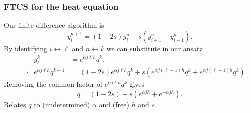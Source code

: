 \documentclass{beamer}
\begin{document}
\begin{frame}
  \frametitle{FTCS for the heat equation}

  Our finite difference algorithm is
  \begin{equation*}
    y_i^{n+1} = ( 1 - 2 s ) y_i^n + s \left( y_{i+1}^n + y_{i-1}^n
    \right).
  \end{equation*} \pause
  By identifying $i \leftrightarrow \ell$ and $n \leftrightarrow k$ we
  can substitute in our ansatz
  \begin{align*}
    && y_{\ell}^k & =  e^{\alpha j \ell h} q^k. \\
    & \implies &
    e^{\alpha j \ell h} q^{k+1} &= (1 - 2 s) e^{\alpha j \ell h} q^k +
    s \left( e^{\alpha j (\ell + 1) h} q^k + e^{\alpha j (\ell - 1) h}
      q^k \right).
  \end{align*} \pause
  Removing the common factor of $e^{\alpha j \ell h} q^k$ gives
  \begin{equation*}
    q = (1 - 2 s) + s \left( e^{\alpha j h} +  e^{-\alpha j h} \right).
  \end{equation*}
  Relates $q$ to (undetermined) $\alpha$ and (free) $h$ and $s$.

\end{frame}
\end{document}
